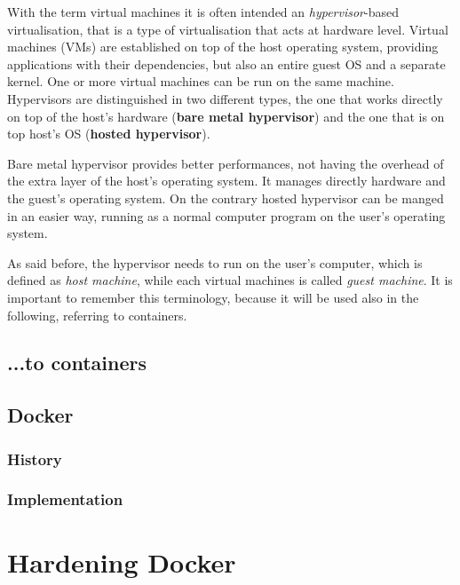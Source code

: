 \documentclass[a4paper,12pt]{article}
\begin{document}
With the term virtual machines it is often intended an \textit{hypervisor}-based
virtualisation, that is a type of virtualisation that acts at hardware level.
Virtual machines (VMs) are established on top of the host operating system,
providing applications with their dependencies, but also an entire guest OS and
a separate kernel. One or more virtual machines can be run on the same machine.
Hypervisors are distinguished in two different types, the one that works
directly on top of the host's hardware (\textbf{bare metal hypervisor}) and the
one that is on top host's OS (\textbf{hosted hypervisor}). \par Bare metal
hypervisor provides better performances, not having the overhead of the extra
layer of the host's operating system. It manages directly hardware and the
guest's operating system. On the contrary hosted hypervisor can be manged in an
easier way, running as a normal computer program on the user's operating system.
\par As said before, the hypervisor needs to run on the user's computer, which
is defined as \textit{host machine}, while each virtual machines is called
\textit{guest machine}. It is important to remember this terminology, because it
will be used also in the following, referring to containers. 



\subsection{...to containers}

\subsection{Docker}

\subsubsection{History}

\subsubsection{Implementation}

\newpage

\section{Hardening Docker}
\end{document}

